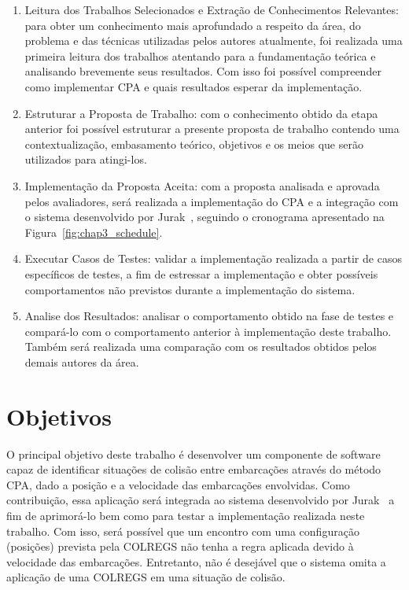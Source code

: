 \begin{enumerate}[label=\alph*)]
            \item Leitura dos Trabalhos Selecionados e Extração de Conhecimentos Relevantes: para obter um conhecimento mais aprofundado a respeito da área, do problema e das técnicas utilizadas pelos autores atualmente, foi realizada uma primeira leitura dos trabalhos atentando para a fundamentação teórica e analisando brevemente seus resultados. Com isso foi possível compreender como implementar CPA e quais resultados esperar da implementação.
            
            \item Estruturar a Proposta de Trabalho: com o conhecimento obtido da etapa anterior foi possível estruturar a presente proposta de trabalho contendo uma contextualização, embasamento teórico, objetivos e os meios que serão utilizados para atingi-los.
            
            \item Implementação da Proposta Aceita: com a proposta analisada e aprovada pelos avaliadores, será realizada a implementação do CPA e a integração com o sistema desenvolvido por Jurak~\cite{JURAK2020}, seguindo o cronograma apresentado na Figura~\ref{fig:chap3_schedule}.
            
            \item Executar Casos de Testes: validar a implementação realizada a partir de casos específicos de testes, a fim de estressar a implementação e obter possíveis comportamentos não previstos durante a implementação do sistema.
            
            \item Analise dos Resultados: analisar o comportamento obtido na fase de testes e compará-lo com o comportamento anterior à implementação deste trabalho. Também será realizada uma comparação com os resultados obtidos pelos demais autores da área. 
        \end{enumerate}
        
    \section{Objetivos}
        O principal objetivo deste trabalho é desenvolver um componente de software capaz de identificar situações de colisão entre embarcações através do método CPA, dado a posição e a velocidade das embarcações envolvidas. Como contribuição, essa aplicação será integrada ao sistema desenvolvido por Jurak~\cite{JURAK2020} a fim de aprimorá-lo bem como para testar a implementação realizada neste trabalho. Com isso, será possível que um encontro com uma configuração (posições) prevista pela COLREGS não tenha a regra aplicada devido à velocidade das embarcações. Entretanto, não é desejável que o sistema omita a aplicação de uma COLREGS em uma situação de colisão. 
        

